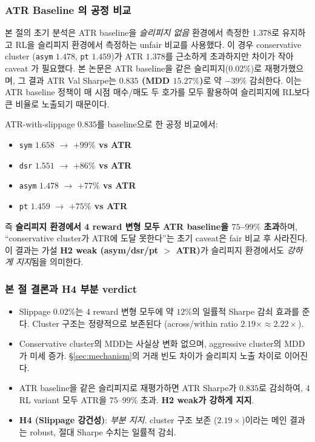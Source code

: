 \documentclass[11pt, a4paper]{article}
\begin{document}
\subsubsection{ATR Baseline 의 공정 비교}
\label{sec:slippage_atr_fair}

본 절의 초기 분석은 ATR baseline을 \emph{슬리피지 없음} 환경에서 측정한 $1.378$로
유지하고 RL을 슬리피지 환경에서 측정하는 unfair 비교를 사용했다. 이 경우
conservative cluster (\texttt{asym} $1.478$, \texttt{pt} $1.459$)가 ATR $1.378$를
근소하게 초과하지만 차이가 작아 caveat 가 필요했다. 본 논문은 ATR baseline을
같은 슬리피지($0.02\%$)로 재평가했으며, 그 결과 ATR Val Sharpe는
\textbf{$0.835$ (MDD $15.27\%$)}로 약 $-39\%$ 감쇠한다. 이는 ATR baseline 정책이
매 시점 매수/매도 두 호가를 모두 활용하여 슬리피지에 RL보다 큰 비율로 노출되기
때문이다.

ATR-with-slippage $0.835$를 baseline으로 한 공정 비교에서:
\begin{itemize}[leftmargin=*]
\item \texttt{sym} $1.658$ $\to$ \textbf{$+99\%$ vs ATR}
\item \texttt{dsr} $1.551$ $\to$ \textbf{$+86\%$ vs ATR}
\item \texttt{asym} $1.478$ $\to$ \textbf{$+77\%$ vs ATR}
\item \texttt{pt} $1.459$ $\to$ \textbf{$+75\%$ vs ATR}
\end{itemize}
즉 \textbf{슬리피지 환경에서 4 reward 변형 모두 ATR baseline을 $75$--$99\%$ 초과}하며,
``conservative cluster가 ATR에 도달 못한다''는 초기 caveat은 fair 비교 후
사라진다. 이 결과는 가설 \textbf{H2 weak (asym/dsr/pt $>$ ATR)}가 슬리피지
환경에서도 \emph{강하게 지지}됨을 의미한다.

\subsubsection{본 절 결론과 H4 부분 verdict}
\label{sec:slippage_conclusion}

\begin{itemize}[leftmargin=*]
\item Slippage $0.02\%$는 4 reward 변형 모두에 약 $12\%$의 일률적 Sharpe 감쇠
효과를 준다. Cluster 구조는 정량적으로 보존된다 (across/within ratio
$2.19\times \approx 2.22\times$).
\item Conservative cluster의 MDD는 사실상 변화 없으며, aggressive cluster의
MDD가 미세 증가. \S\ref{sec:mechanism}의 거래 빈도 차이가 슬리피지 노출 차이로
이어진다.
\item ATR baseline을 같은 슬리피지로 재평가하면 ATR Sharpe가 $0.835$로 감쇠하여,
4 RL variant 모두 ATR을 $75$--$99\%$ 초과. \textbf{H2 weak가 강하게 지지}.
\item \textbf{H4 (Slippage 강건성)}: \emph{부분 지지}. cluster 구조 보존
($2.19\times$)이라는 메인 결과는 robust, 절대 Sharpe 수치는 일률적 감쇠.
\end{itemize}
\end{document}
